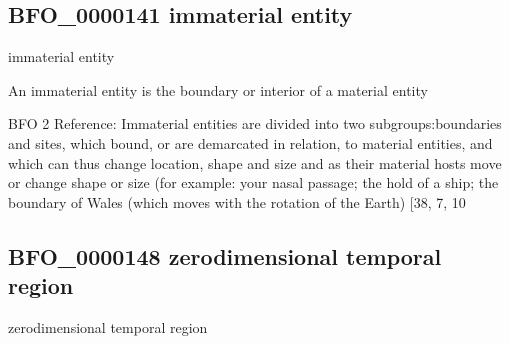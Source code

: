 \documentclass[letterpaper,10pt,english]{sphinxmanual}
\begin{document}
\subsection{BFO\_0000141 \sphinxhyphen{} immaterial entity}
\label{\detokenize{doc-BFO_0000141:bfo-0000141-immaterial-entity}}\label{\detokenize{doc-BFO_0000141:index-0}}\label{\detokenize{doc-BFO_0000141::doc}}
\begin{sphinxShadowBox}

\sphinxAtStartPar
immaterial entity
\end{sphinxShadowBox}

\begin{sphinxShadowBox}

\sphinxAtStartPar
An immaterial entity is the boundary or interior of a material entity
\end{sphinxShadowBox}

\begin{sphinxShadowBox}

\sphinxAtStartPar
BFO 2 Reference: Immaterial entities are divided into two subgroups:boundaries and sites, which bound, or are demarcated in relation, to material entities, and which can thus change location, shape and size and as their material hosts move or change shape or size (for example: your nasal passage; the hold of a ship; the boundary of Wales (which moves with the rotation of the Earth) {[}38, 7, 10
\end{sphinxShadowBox}

\begin{sphinxShadowBox}

\sphinxAtStartPar
{}
\end{sphinxShadowBox}
\begin{quote}

\ignorespaces \end{quote}


\subsection{BFO\_0000148 \sphinxhyphen{} zero\sphinxhyphen{}dimensional temporal region}
\label{\detokenize{doc-BFO_0000148:bfo-0000148-zero-dimensional-temporal-region}}\label{\detokenize{doc-BFO_0000148:index-0}}\label{\detokenize{doc-BFO_0000148::doc}}
\begin{sphinxShadowBox}

\sphinxAtStartPar
zero\sphinxhyphen{}dimensional temporal region
\end{sphinxShadowBox}
\end{document}
